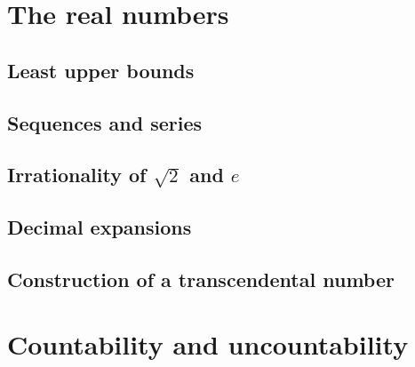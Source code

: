 \documentclass[main.tex]{subfiles}
\begin{document}
	\section{The real numbers}
		\subsection{Least upper bounds}
		
		\subsection{Sequences and series}
		
		\subsection{Irrationality of $\sqrt{2}$ and $e$}
		
		\subsection{Decimal expansions}
		
		\subsection{Construction of a transcendental number}
	\section{Countability and uncountability}
		
	
\end{document}
